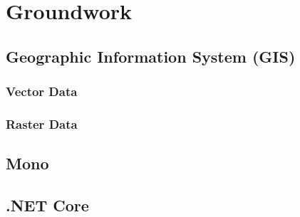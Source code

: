 
\chapter{Groundwork}



\section{Geographic Information System (GIS)}


\subsection{Vector Data}


\subsection{Raster Data}



\section{Mono}



\section{.NET Core}
